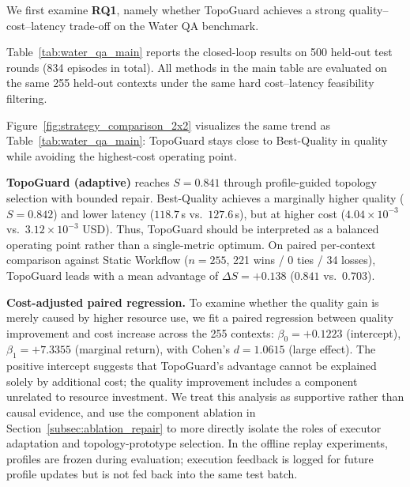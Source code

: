 \documentclass[manuscript,review,anonymous]{acmart}
\begin{document}
We first examine \textbf{RQ1}, namely whether TopoGuard achieves a strong quality--cost--latency trade-off on the Water QA benchmark.

Table~\ref{tab:water_qa_main} reports the closed-loop results on 500 held-out test rounds (834 episodes in total). All methods in the main table are evaluated on the same 255 held-out contexts under the same hard cost--latency feasibility filtering.

Figure~\ref{fig:strategy_comparison_2x2} visualizes the same trend as Table~\ref{tab:water_qa_main}: TopoGuard stays close to Best-Quality in quality while avoiding the highest-cost operating point. 

\textbf{TopoGuard (adaptive)} reaches $S=0.841$ through profile-guided topology selection with bounded repair. Best-Quality achieves a marginally higher quality ($S=0.842$) and lower latency ($118.7$\,s vs.\ $127.6$\,s), but at higher cost ($4.04\times10^{-3}$ vs.\ $3.12\times10^{-3}$ USD). Thus, TopoGuard should be interpreted as a balanced operating point rather than a single-metric optimum. On paired per-context comparison against Static Workflow ($n=255$, 221 wins / 0 ties / 34 losses), TopoGuard leads with a mean advantage of $\Delta S=+0.138$ ($0.841$ vs.\ $0.703$).

\textbf{Cost-adjusted paired regression.} To examine whether the quality gain is merely caused by higher resource use, we fit a paired regression between quality improvement and cost increase across the 255 contexts: $\beta_0=+0.1223$ (intercept), $\beta_1=+7.3355$ (marginal return), with Cohen's $d=1.0615$ (large effect). The positive intercept suggests that TopoGuard's advantage cannot be explained solely by additional cost; the quality improvement includes a component unrelated to resource investment. We treat this analysis as supportive rather than causal evidence, and use the component ablation in Section~\ref{subsec:ablation_repair} to more directly isolate the roles of executor adaptation and topology-prototype selection. In the offline replay experiments, profiles are frozen during evaluation; execution feedback is logged for future profile updates but is not fed back into the same test batch.
\end{document}
